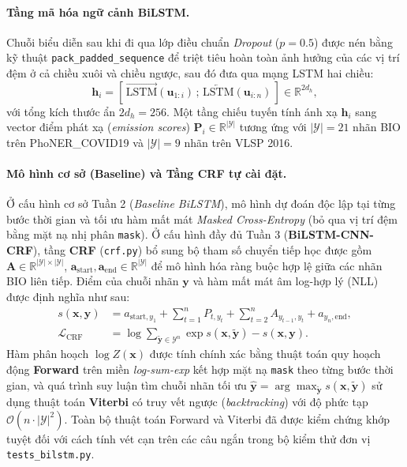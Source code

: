 \paragraph{Tầng mã hóa ngữ cảnh BiLSTM.}
Chuỗi biểu diễn sau khi đi qua lớp điều chuẩn \textit{Dropout} ($p=0.5$) được nén bằng kỹ thuật \texttt{pack\_padded\_sequence} để triệt tiêu hoàn toàn ảnh hưởng của các vị trí đệm ở cả chiều xuôi và chiều ngược, sau đó đưa qua mạng LSTM hai chiều:
\begin{equation}
    \mathbf{h}_i = \left[\,\overrightarrow{\text{LSTM}}(\mathbf{u}_{1:i}) \,;\, \overleftarrow{\text{LSTM}}(\mathbf{u}_{i:n})\,\right] \in \mathbb{R}^{2d_h},
\end{equation}
với tổng kích thước ẩn $2d_h = 256$. Một tầng chiếu tuyến tính ánh xạ $\mathbf{h}_i$ sang vector điểm phát xạ (\textit{emission scores}) $\mathbf{P}_i \in \mathbb{R}^{|\mathcal{Y}|}$ tương ứng với $|\mathcal{Y}| = 21$ nhãn BIO trên PhoNER\_COVID19 và $|\mathcal{Y}| = 9$ nhãn trên VLSP 2016.

\paragraph{Mô hình cơ sở (Baseline) và Tầng CRF tự cài đặt.}
Ở cấu hình cơ sở Tuần 2 (\textit{Baseline BiLSTM}), mô hình dự đoán độc lập tại từng bước thời gian và tối ưu hàm mất mát \textit{Masked Cross-Entropy} (bỏ qua vị trí đệm bằng mặt nạ nhị phân \texttt{mask}). Ở cấu hình đầy đủ Tuần 3 (\textbf{BiLSTM-CNN-CRF}), tầng \textbf{CRF} (\texttt{crf.py}) bổ sung bộ tham số chuyển tiếp học được gồm $\mathbf{A} \in \mathbb{R}^{|\mathcal{Y}|\times|\mathcal{Y}|}$, $\mathbf{a}_{\text{start}}, \mathbf{a}_{\text{end}} \in \mathbb{R}^{|\mathcal{Y}|}$ để mô hình hóa ràng buộc hợp lệ giữa các nhãn BIO liên tiếp. Điểm của chuỗi nhãn $\mathbf{y}$ và hàm mất mát âm log-hợp lý (NLL) được định nghĩa như sau:
\begin{align}
    s(\mathbf{x}, \mathbf{y}) &= a_{\text{start}, y_1} + \sum_{t=1}^{n} P_{t, y_t} + \sum_{t=2}^{n} A_{y_{t-1}, y_t} + a_{y_n, \text{end}}, \\
    \mathcal{L}_{\text{CRF}} &= \log \sum_{\tilde{\mathbf{y}} \in \mathcal{Y}^n} \exp s(\mathbf{x}, \tilde{\mathbf{y}}) - s(\mathbf{x}, \mathbf{y}).
\end{align}
Hàm phân hoạch $\log Z(\mathbf{x})$ được tính chính xác bằng thuật toán quy hoạch động \textbf{Forward} trên miền \textit{log-sum-exp} kết hợp mặt nạ \texttt{mask} theo từng bước thời gian, và quá trình suy luận tìm chuỗi nhãn tối ưu $\hat{\mathbf{y}} = \arg\max_{\tilde{\mathbf{y}}} s(\mathbf{x}, \tilde{\mathbf{y}})$ sử dụng thuật toán \textbf{Viterbi} có truy vết ngược (\textit{backtracking}) với độ phức tạp $\mathcal{O}(n \cdot |\mathcal{Y}|^2)$. Toàn bộ thuật toán Forward và Viterbi đã được kiểm chứng khớp tuyệt đối với cách tính vét cạn trên các câu ngắn trong bộ kiểm thử đơn vị \texttt{tests\_bilstm.py}.

